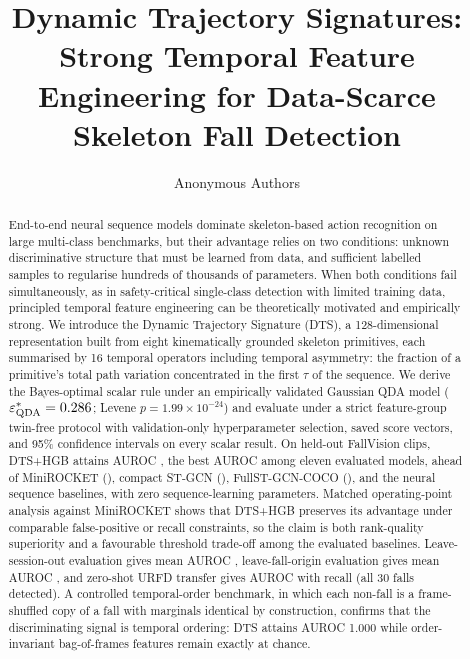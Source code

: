 \documentclass[letterpaper]{article}
\title{Dynamic Trajectory Signatures: Strong Temporal Feature Engineering for Data-Scarce Skeleton Fall Detection}
\author{Anonymous Authors}
\begin{document}
\maketitle

\begin{abstract}
End-to-end neural sequence models dominate skeleton-based action recognition on large multi-class benchmarks, but their advantage relies on two conditions: unknown discriminative structure that must be learned from data, and sufficient labelled samples to regularise hundreds of thousands of parameters. When both conditions fail simultaneously, as in safety-critical single-class detection with limited training data, principled temporal feature engineering can be theoretically motivated and empirically strong. We introduce the Dynamic Trajectory Signature (DTS), a 128-dimensional representation built from eight kinematically grounded skeleton primitives, each summarised by 16 temporal operators including temporal asymmetry: the fraction of a primitive's total path variation concentrated in the first $\tau$ of the sequence. We derive the Bayes-optimal scalar rule under an empirically validated Gaussian QDA model ($\varepsilon^*_{\mathrm{QDA}} = 0.286$; Levene $p = 1.99{\times}10^{-24}$) and evaluate under a strict feature-group twin-free protocol with validation-only hyperparameter selection, saved score vectors, and 95\% confidence intervals on every scalar result. On \testn{} held-out FallVision clips, DTS+HGB attains AUROC \DTSHGBauroc{} \DTSHGBaurocCI, the best AUROC among eleven evaluated models, ahead of MiniROCKET (\MiniROCKETauroc), compact ST-GCN (\SimpleSTGCNauroc), FullST-GCN-COCO (\FullSTGCNauroc), and the neural sequence baselines, with zero sequence-learning parameters. Matched operating-point analysis against MiniROCKET shows that DTS+HGB preserves its advantage under comparable false-positive or recall constraints, so the claim is both rank-quality superiority and a favourable threshold trade-off among the evaluated baselines. Leave-session-out evaluation gives mean AUROC \lsomeanauroc, leave-fall-origin evaluation gives mean AUROC \lfomeanauroc, and zero-shot URFD transfer gives AUROC \urfdauroc{} \urfdaurocCI{} with recall \urfdrec{} (all 30 falls detected). A controlled temporal-order benchmark, in which each non-fall is a frame-shuffled copy of a fall with marginals identical by construction, confirms that the discriminating signal is temporal ordering: DTS attains AUROC 1.000 while order-invariant bag-of-frames features remain exactly at chance.
\end{abstract}
\end{document}
